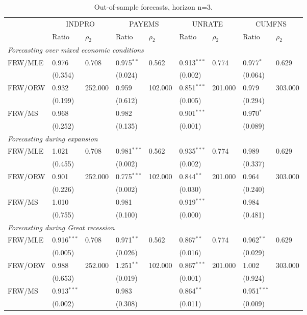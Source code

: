 \begin{table}
\centering
\small
\begin{tabular}{lllllllll}
\toprule
 & \multicolumn{2}{c}{INDPRO} & \multicolumn{2}{c}{PAYEMS} & \multicolumn{2}{c}{UNRATE} & \multicolumn{2}{c}{CUMFNS} \\
 & Ratio & $\rho_2$ & Ratio & $\rho_2$ & Ratio & $\rho_2$ & Ratio & $\rho_2$ \\
\midrule
\multicolumn{9}{l}{\textit{Forecasting over mixed economic conditions}}\\\midrule
FRW/MLE & 0.976 & 0.708 & 0.975$^{**}$ & 0.562 & 0.913$^{***}$ & 0.774 & 0.977$^{*}$ & 0.629 \\
 & (0.354) &  & (0.024) &  & (0.002) &  & (0.064) &  \\[1ex]
FRW/ORW & 0.932 & 252.000 & 0.959 & 102.000 & 0.851$^{***}$ & 201.000 & 0.979 & 303.000 \\
 & (0.199) &  & (0.612) &  & (0.005) &  & (0.294) &  \\[1ex]
FRW/MS & 0.968 &  & 0.982 &  & 0.901$^{***}$ &  & 0.970$^{*}$ &  \\
 & (0.252) &  & (0.135) &  & (0.001) &  & (0.089) &  \\[1ex]
\midrule
\multicolumn{9}{l}{\textit{Forecasting during expansion}}\\\midrule
FRW/MLE & 1.021 & 0.708 & 0.981$^{***}$ & 0.562 & 0.935$^{***}$ & 0.774 & 0.989 & 0.629 \\
 & (0.455) &  & (0.002) &  & (0.002) &  & (0.337) &  \\[1ex]
FRW/ORW & 0.901 & 252.000 & 0.775$^{***}$ & 102.000 & 0.844$^{**}$ & 201.000 & 0.964 & 303.000 \\
 & (0.226) &  & (0.002) &  & (0.030) &  & (0.240) &  \\[1ex]
FRW/MS & 1.010 &  & 0.981 &  & 0.919$^{***}$ &  & 0.984 &  \\
 & (0.755) &  & (0.100) &  & (0.000) &  & (0.481) &  \\[1ex]
\midrule
\multicolumn{9}{l}{\textit{Forecasting during Great recession}}\\\midrule
FRW/MLE & 0.916$^{***}$ & 0.708 & 0.971$^{**}$ & 0.562 & 0.867$^{**}$ & 0.774 & 0.962$^{**}$ & 0.629 \\
 & (0.005) &  & (0.026) &  & (0.016) &  & (0.029) &  \\[1ex]
FRW/ORW & 0.988 & 252.000 & 1.251$^{**}$ & 102.000 & 0.867$^{***}$ & 201.000 & 1.002 & 303.000 \\
 & (0.653) &  & (0.019) &  & (0.001) &  & (0.924) &  \\[1ex]
FRW/MS & 0.913$^{***}$ &  & 0.983 &  & 0.864$^{**}$ &  & 0.951$^{***}$ &  \\
 & (0.002) &  & (0.308) &  & (0.011) &  & (0.009) &  \\[1ex]
\bottomrule
\end{tabular}
\caption{Out-of-sample forecasts, horizon n=3.}
\end{table}